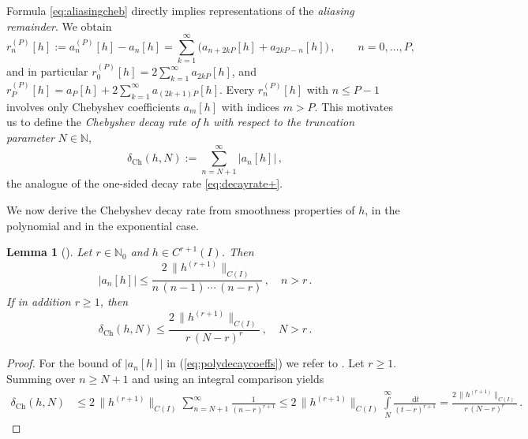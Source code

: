 \documentclass[11pt,a4paper]{scrartcl}
\renewcommand{\d}{\,\mathrm{d}}
\newtheorem{lemma}[theorem]{Lemma}
\numberwithin{equation}{section}
\numberwithin{table}{section}
\numberwithin{figure}{section}
\newcommand{\N}{\mathbb N}
\newcommand{\dch}{\delta_{\mathrm{Ch}}}
\begin{document}
Formula \eqref{eq:aliasingcheb} directly implies representations of the \emph{aliasing remainder}.
 We obtain
\begin{equation}
\label{eq:aliasrem}
r_n^{(P)}[h] := a_n^{(P)}[h] - a_n[h]  = \sum_{k=1}^{\infty}\bigl(a_{n+2kP}[h]+a_{2kP-n}[h]\bigr)\,, \qquad n =0, \ldots , P,
\end{equation}
and in particular $r_0^{(P)}[h] = 2\sum_{k=1}^{\infty }a_{2kP}[h]$, and $r_P^{(P)}[h] = a_P[h] + 2\sum_{k=1}^{\infty}a_{(2k+1)P}[h]$. Every $r_n^{(P)}[h]$ with
$n \leq P-1$ involves only Chebyshev coefficients $a_m[h]$ with indices $m>P$. This
motivates us to define the \emph{Chebyshev decay rate of} $h$ \emph{with respect to the
truncation parameter} $N \in \N$,
\begin{equation}
\label{eq:dch}
\textstyle \dch(h,N) := \sum\limits_{n=N+1}^{\infty}|a_n[h]|\,,
\end{equation}
the analogue of the one-sided decay rate \eqref{eq:decayrate+}.

We now derive the Chebyshev decay rate from smoothness properties of $h$, in the polynomial and
in the exponential case.

\begin{lemma}[{\cite[Theorem~6.16]{PlPoStTa23}}]
	\label{Lemma:Cpolydecay}
	Let $r\in\N_0$ and $h\in C^{r+1}(I)$. Then
	\begin{equation}
		\label{eq:polydecaycoeffs}
		\textstyle |a_n[h]| \leq \frac{2\,\|h^{(r+1)}\|_{C(I)}}{n\,(n-1)\,\cdots\,(n-r)}\,, \quad n>r\,.
	\end{equation}
	If in addition $r \ge 1$, then
	\begin{equation}
		\label{eq:polydecaytail}
		\textstyle \dch(h,N) \leq \frac{2\,\|h^{(r+1)}\|_{C(I)}}{r\,(N-r)^r}\,, \quad N>r\,.
	\end{equation}
\end{lemma}

\begin{proof} For the  bound of $|a_n[h]|$   in (\ref{eq:polydecaycoeffs}) we refer to  \cite[Theorem 6.16]{PlPoStTa23}. Let $r \ge 1$. Summing over
$n \geq N+1$ and using an integral comparison yields
\begin{align*}
\dch(h,N) & \leq \textstyle 2\,\|h^{(r+1)}\|_{C(I)}\sum\limits_{n=N+1}^\infty \frac{1}{(n-r)^{r+1}}
\leq  \textstyle 2\,\|h^{(r+1)}\|_{C(I)}\int\limits_N^\infty\frac{\d t}{(t-r)^{r+1}}
= \frac{2\,\|h^{(r+1)}\|_{C(I)}}{r\,(N-r)^r}\,.
\end{align*}
\vspace*{-5mm}

\end{proof}
\end{document}
